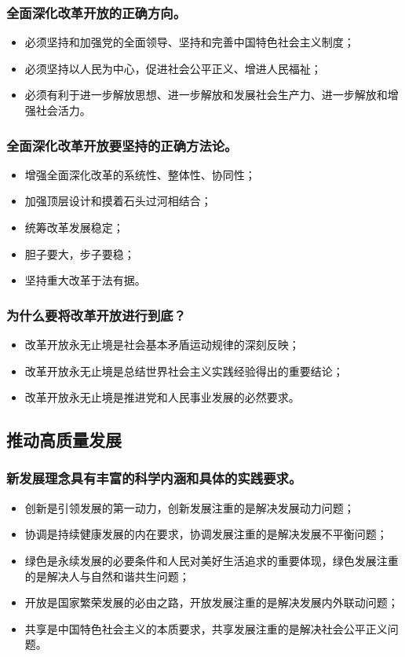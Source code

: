 \documentclass{article}
\begin{document}
\subsubsection{全面深化改革开放的正确方向。}
\begin{itemize}
    \item 必须坚持和加强党的全面领导、坚持和完善中国特色社会主义制度；
    \item 必须坚持以人民为中心，促进社会公平正义、增进人民福祉；
    \item 必须有利于进一步解放思想、进一步解放和发展社会生产力、进一步解放和增强社会活力。
\end{itemize}

\subsubsection{全面深化改革开放要坚持的正确方法论。}
\begin{itemize}
    \item 增强全面深化改革的系统性、整体性、协同性；
    \item 加强顶层设计和摸着石头过河相结合；
    \item 统筹改革发展稳定；
    \item 胆子要大，步子要稳；
    \item 坚持重大改革于法有据。
\end{itemize}

\subsubsection{为什么要将改革开放进行到底？}
\begin{itemize}
    \item 改革开放永无止境是社会基本矛盾运动规律的深刻反映；
    \item 改革开放永无止境是总结世界社会主义实践经验得出的重要结论；
    \item 改革开放永无止境是推进党和人民事业发展的必然要求。
\end{itemize}

\subsection{推动高质量发展}

\subsubsection{新发展理念具有丰富的科学内涵和具体的实践要求。}
\begin{itemize}
    \item 创新是引领发展的第一动力，创新发展注重的是解决发展动力问题；
    \item 协调是持续健康发展的内在要求，协调发展注重的是解决发展不平衡问题；
    \item 绿色是永续发展的必要条件和人民对美好生活追求的重要体现，绿色发展注重的是解决人与自然和谐共生问题；
    \item 开放是国家繁荣发展的必由之路，开放发展注重的是解决发展内外联动问题；
    \item 共享是中国特色社会主义的本质要求，共享发展注重的是解决社会公平正义问题。
\end{itemize}
\end{document}
